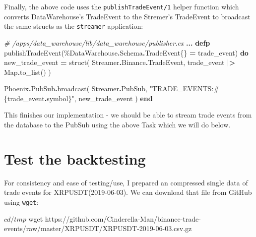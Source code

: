\documentclass[
  oneside]{book}
\newenvironment{Shaded}{\begin{snugshade}}{\end{snugshade}}
\newcommand{\CommentTok}[1]{\textcolor[rgb]{0.56,0.35,0.01}{\textit{#1}}}
\newcommand{\ConstantTok}[1]{\textcolor[rgb]{0.00,0.00,0.00}{#1}}
\newcommand{\ExtensionTok}[1]{#1}
\newcommand{\KeywordTok}[1]{\textcolor[rgb]{0.13,0.29,0.53}{\textbf{#1}}}
\newcommand{\NormalTok}[1]{#1}
\newcommand{\OperatorTok}[1]{\textcolor[rgb]{0.81,0.36,0.00}{\textbf{#1}}}
\newcommand{\OtherTok}[1]{\textcolor[rgb]{0.56,0.35,0.01}{#1}}
\newcommand{\StringTok}[1]{\textcolor[rgb]{0.31,0.60,0.02}{#1}}
\begin{document}
Finally, the above code uses the \texttt{publishTradeEvent/1} helper function which converts DataWarehouse's TradeEvent to the Stremer's TradeEvent to broadcast the same structs as the \texttt{streamer} application:

\begin{Shaded}
\begin{Highlighting}[]
  \CommentTok{\# /apps/data\_warehouse/lib/data\_warehouse/publisher.ex}
  \OperatorTok{...}
  \KeywordTok{defp}\NormalTok{ publishTradeEvent(\%}\ConstantTok{DataWarehouse}\OperatorTok{.}\ConstantTok{Schema}\OperatorTok{.}\ConstantTok{TradeEvent}\NormalTok{\{\} }\OperatorTok{=}\NormalTok{ trade\_event) }\KeywordTok{do}
\NormalTok{    new\_trade\_event }\OperatorTok{=}
\NormalTok{      struct(}
        \ConstantTok{Streamer}\OperatorTok{.}\ConstantTok{Binance}\OperatorTok{.}\ConstantTok{TradeEvent}\NormalTok{,}
\NormalTok{        trade\_event }\OperatorTok{|\textgreater{}} \ConstantTok{Map}\OperatorTok{.}\NormalTok{to\_list()}
\NormalTok{      )}

    \ConstantTok{Phoenix}\OperatorTok{.}\ConstantTok{PubSub}\OperatorTok{.}\NormalTok{broadcast(}
      \ConstantTok{Streamer}\OperatorTok{.}\ConstantTok{PubSub}\NormalTok{,}
      \StringTok{"TRADE\_EVENTS:}\OtherTok{\#\{}\NormalTok{trade\_event}\OperatorTok{.}\NormalTok{symbol}\OtherTok{\}}\StringTok{"}\NormalTok{,}
\NormalTok{      new\_trade\_event}
\NormalTok{    )}
  \KeywordTok{end}
\end{Highlighting}
\end{Shaded}

This finishes our implementation - we should be able to stream trade events from the database to the PubSub using the above Task which we will do below.

\hypertarget{test-the-backtesting}{%
\section{Test the backtesting}\label{test-the-backtesting}}

For consistency and ease of testing/use, I prepared an compressed single data of trade events for XRPUSDT(2019-06-03). We can download that file from GitHub using \texttt{wget}:

\begin{Shaded}
\begin{Highlighting}[]
\ExtensionTok{$}\NormalTok{ cd /tmp}
\ExtensionTok{$}\NormalTok{ wget https://github.com/Cinderella{-}Man/binance{-}trade{-}events/raw/master/XRPUSDT/XRPUSDT{-}2019{-}06{-}03.csv.gz}
\end{Highlighting}
\end{Shaded}
\end{document}
